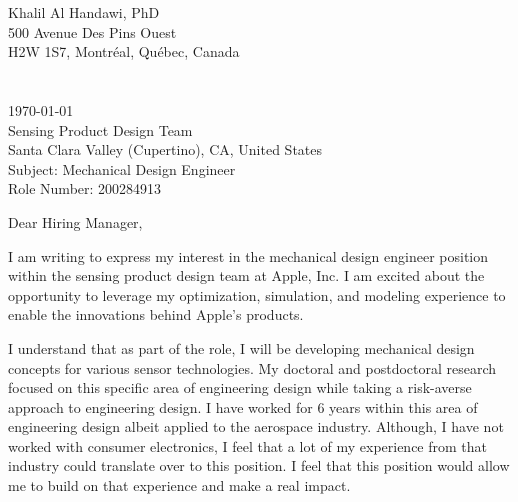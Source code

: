\documentclass[12pt]{article} %
\begin{document}

Khalil Al Handawi, PhD\\
500 Avenue Des Pins Ouest\\
H2W 1S7, Montr\'{e}al, Qu\'{e}bec, Canada\\
\faPhone~~\cvnumberphone\\
\faEnvelope~~\href{mailto:\cvmail}{\cvmail}\\

\today\\

Sensing Product Design Team\\
Santa Clara Valley (Cupertino), CA, United States\\
Subject: Mechanical Design Engineer\\
Role Number: 200284913\\[6pt] \medskip


Dear Hiring Manager,

\medskip %

I am writing to express my interest in the mechanical design engineer position within the sensing product design team at Apple, Inc. I am excited about the opportunity to leverage my optimization, simulation, and modeling experience to enable the innovations behind Apple's products.

\medskip %

I understand that as part of the role, I will be developing mechanical design concepts for various sensor technologies. My doctoral and postdoctoral research focused on this specific area of engineering design while taking a risk-averse approach to engineering design. I have worked for 6 years within this area of engineering design albeit applied to the aerospace industry. Although, I have not worked with consumer electronics, I feel that a lot of my experience from that industry could translate over to this position. I feel that this position would allow me to build on that experience and make a real impact.

\medskip %
\end{document}
